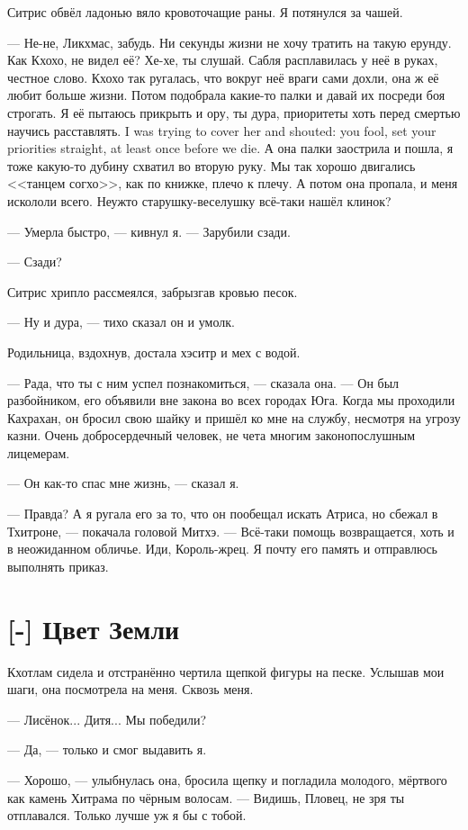 Ситрис обвёл ладонью вяло кровоточащие раны.
Я потянулся за чашей.

--- Не-не, Ликхмас, забудь.
Ни секунды жизни не хочу тратить на такую ерунду.
Как Кхохо, не видел её?
Хе-хе, ты слушай.
Сабля расплавилась у неё в руках, честное слово.
Кхохо так ругалась, что вокруг неё враги сами дохли, она ж её любит больше жизни.
Потом подобрала какие-то палки и давай их посреди боя строгать.
{Я её пытаюсь прикрыть и ору, ты дура, приоритеты хоть перед смертью научись расставлять.}
{I was trying to cover her and shouted: you fool, set your priorities straight, at least once before we die.}
А она палки заострила и пошла, я тоже какую-то дубину схватил во вторую руку.
Мы так хорошо двигались <<танцем согхо>>, как по книжке, плечо к плечу.
А потом она пропала, и меня искололи всего.
Неужто старушку-веселушку всё-таки нашёл клинок?

--- Умерла быстро, --- кивнул я.
--- Зарубили сзади.

--- Сзади?

Ситрис хрипло рассмеялся, забрызгав кровью песок.

--- Ну и дура, --- тихо сказал он и умолк.

Родильница, вздохнув, достала хэситр и мех с водой.

--- Рада, что ты с ним успел познакомиться, --- сказала она.
--- Он был разбойником, его объявили вне закона во всех городах Юга.
Когда мы проходили Кахрахан, он бросил свою шайку и пришёл ко мне на службу, несмотря на угрозу казни.
Очень добросердечный человек, не чета многим законопослушным лицемерам.

--- Он как-то спас мне жизнь, --- сказал я.

--- Правда?
А я ругала его за то, что он пообещал искать Атриса, но сбежал в Тхитроне, --- покачала головой Митхэ.
--- Всё-таки помощь возвращается, хоть и в неожиданном обличье.
Иди, Король-жрец.
Я почту его память и отправлюсь выполнять приказ.

\section{[-] Цвет Земли}

Кхотлам сидела и отстранённо чертила щепкой фигуры на песке.
Услышав мои шаги, она посмотрела на меня.
Сквозь меня.

--- Лисёнок...
Дитя...
Мы победили?

--- Да, --- только и смог выдавить я.

--- Хорошо, --- улыбнулась она, бросила щепку и погладила молодого, мёртвого как камень Хитрама по чёрным волосам.
--- Видишь, Пловец, не зря ты отплавался.
Только лучше уж я бы с тобой.

